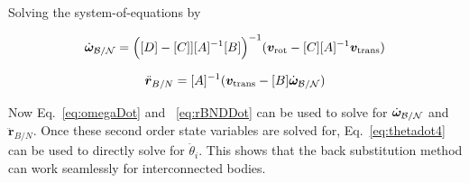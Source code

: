 \documentclass[paper]{aiaaNew}
\begin{document}
Solving the system-of-equations by

\begin{equation}
\dot{\bm\omega}_{\cal B/N} = \Big([D] - [C]][A]^{-1}[B]\Big)^{-1}(\bm v_{\text{rot}} - [C][A]^{-1}\bm v_{\text{trans}})
\label{eq:omegaDot}
\end{equation}

\begin{equation}
\ddot{\bm r}_{B/N} = [A]^{-1} (\bm v_{\text{trans}} - [B]\dot{\bm\omega}_{\cal B/N})
\label{eq:rBNDDot}
\end{equation}
	
Now Eq.~\eqref{eq:omegaDot} and ~\eqref{eq:rBNDDot} can be used to solve for $\dot{\bm\omega}_{\cal B/N}$ and $\ddot{\bm r}_{B/N}$. Once these second order state variables are solved for, Eq.~\eqref{eq:thetadot4} can be used to directly solve for $\ddot \theta_{i}$. This shows that the back substitution method can work seamlessly for interconnected bodies.

  
\end{document}
